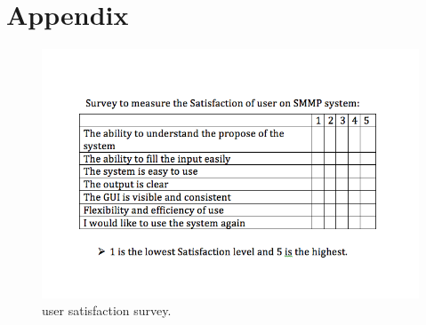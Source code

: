 \documentclass[12pt, titlepage]{article}
\begin{document}
~\newpage




\newpage

\section{Appendix}
 \begin{figure}[h!]
 \begin{center}
 \includegraphics [width=\textwidth]{survey}
 \caption{\label{ Figure 1:} user satisfaction survey.}
 \end{center}
 \end{figure}
\end{document}
